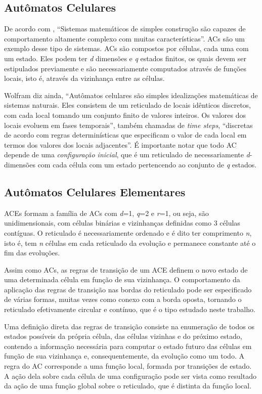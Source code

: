 \documentclass[a4paper,12pt]{ltxdoc}
\newcommand\tab[1][1cm]{\hspace*{#1}}
\begin{document}
\subsection{Autômatos Celulares} \label{ref_ac}
De acordo com \cite{wolfram1983cellular}, ``Sistemas matemáticos de simples construção são capazes de comportamento altamente complexo com muitas características''. ACs são um exemplo desse tipo de sistemas. ACs são compostos por células, cada uma com um estado. Eles podem ter \textit{d} dimensões e \textit{q} estados finitos, os quais devem ser estipulados previamente e são necessariamente computados através de funções locais, isto é, através da vizinhança entre as células.

\tab Wolfram diz ainda, ``Autômatos celulares são simples idealizações matemáticas de sistemas naturais. Eles consistem de um reticulado de locais idênticos discretos, com cada local tomando um conjunto finito de valores inteiros. Os valores dos locais evoluem em fases temporais'', também chamadas de \textit{time steps}, ``discretas de acordo com regras determinísticas que especificam o valor de cada local em termos dos valores dos locais adjacentes''. É importante notar que todo AC depende de uma \textit{configuração inicial}, que é um reticulado de necessariamente \textit{d}-dimensões com cada célula com um estado pertencendo ao conjunto de \textit{q} estados.

\subsection{Autômatos Celulares Elementares} \label{ref_ace}

ACEs formam a família de ACs com \textit{d}=1, \textit{q}=2 e \textit{r}=1, ou seja, são unidimensionais, com células binárias e vizinhanças definidas como 3 células contíguas. O reticulado é necessariamente ordenado e é dito ter comprimento \textit{n}, isto é, tem \textit{n} células em cada reticulado da evolução e permanece constante até o fim das evoluções.

\tab Assim como ACs, as regras de transição de um ACE definem o novo estado de uma determinada célula em função de sua vizinhança. O comportamento da aplicação das regras de transição nas bordas do reticulado pode ser especificado de várias formas, muitas vezes como conexo com a borda oposta, tornando o reticulado efetivamente circular e contínuo, que é o tipo estudado neste trabalho.

\tab Uma definição direta das regras de transição consiste na enumeração de todos os estados possíveis da própria célula, das células vizinhas e do próximo estado, contendo a informação necessária para computar o estado futuro das células em função de sua vizinhança e, consequentemente, da evolução como um todo. A regra do AC corresponde a uma função local, formada por transições de estado. A ação dela sobre cada célula de uma configuração pode ser vista como resultado da ação de uma função global sobre o reticulado, que é distinta da função local.
\end{document}
